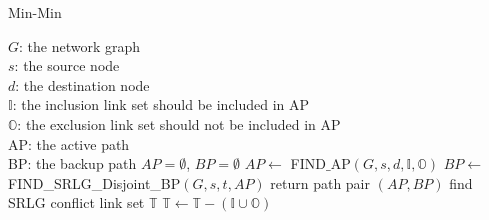 \begin{algorithm}
\caption{Min-Min}
\begin{algorithmic}[1]
\label{alg:min-min}
\REQUIRE
$G$: the network graph\\
$s$: the source node\\
$d$: the destination node \\
$\mathbb{I}$:   the inclusion link set should be included in AP\\
$\mathbb{O}$: the exclusion link set should not be included in AP\\
\ENSURE
AP: the active path\\
BP: the backup path
\STATE $AP=\emptyset$, $BP=\emptyset$
\STATE $AP\leftarrow$ FIND$\_$AP$(G,s,d,\mathbb{I},\mathbb{O})$
    \STATE $BP\leftarrow$ FIND\_SRLG\_Disjoint\_BP$(G,s,t,AP)$
        \STATE return path pair $(AP,BP)$
    \ELSE
        \STATE find SRLG conflict link set $\mathbb{T}$
        \STATE $\mathbb{T}\leftarrow \mathbb{T}-(\mathbb{I}\cup\mathbb{O})$
        \ENDIF

    \ENDIF
\ENDIF
\end{algorithmic}
\end{algorithm}

